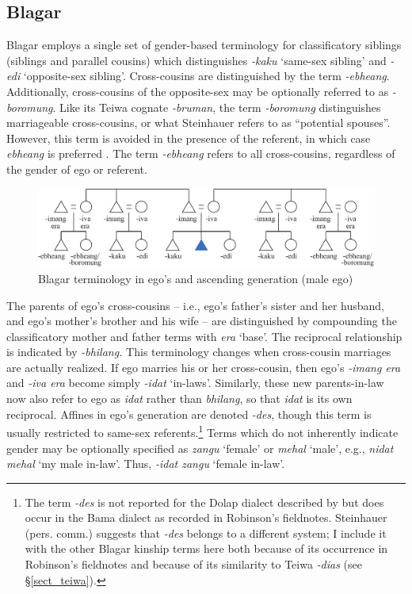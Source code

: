 \subsection{Blagar}\label{sect_blagar}
Blagar employs a single set of gender-based terminology for classificatory siblings (siblings and parallel cousins) which distinguishes \textit{-kaku} `same-sex sibling' and \textit{-edi} `opposite-sex sibling'. Cross-cousins are distinguished by the term \textit{-ebheang}. Additionally, cross-cousins of the opposite-sex may be optionally referred to as \textit{-boromung}. Like its Teiwa cognate \textit{-bruman}, the term \textit{-boromung} distinguishes marriageable cross-cousins, or what Steinhauer refers to as ``potential spouses''. However, this term is avoided in the presence of the referent, in which case \textit{ebheang} is preferred \citep[156]{Steinhauer1993}. The term \textit{-ebheang} refers to all cross-cousins, regardless of the gender of ego or referent.


\begin{figure}
\includegraphics[width=\textwidth]{figures/Holton_ch5_fig7.pdf}
\caption{Blagar terminology in ego's and ascending generation (male ego) }
\label{fig:5:figure_blagar}
\end{figure}  
 

 

The parents of ego's cross-cousins -- i.e., ego's father's sister and her husband, and ego's mother's brother and his wife -- are distinguished by compounding the classificatory mother and father terms with \textit{era} `base'. The reciprocal relationship is indicated by \textit{-bhilang.} This terminology changes when cross-cousin marriages are actually realized. If ego marries his or her cross-cousin, then ego's \textit{-imang era} and \textit{-iva era} become simply \textit{-idat} `in-laws'. Similarly, these new parents-in-law now also refer to ego as \textit{idat} rather than \textit{bhilang}, so that \textit{idat} is its own reciprocal. Affines in ego's generation are denoted \textit{-des}, though this term is usually restricted to same-sex referents.\footnote{{ }  The term \textit{-des} is not reported for the Dolap dialect described by \citet{Steinhauer1993} but does occur in the Bama dialect as recorded in Robinson's fieldnotes. Steinhauer (pers. comm.) suggests that \textit{-des} belongs to a different system; I include it with the other Blagar kinship terms here both because of its occurrence in Robinson's fieldnotes and because of its similarity to Teiwa \textit{-dias} (see {\S}\ref{sect_teiwa}).} Terms which do not inherently indicate gender may be optionally specified as \textit{zangu} `female' or \textit{mehal} `male', e.g., \textit{nidat mehal} `my male in-law'. Thus, \textit{-idat zangu} `female in-law'.




